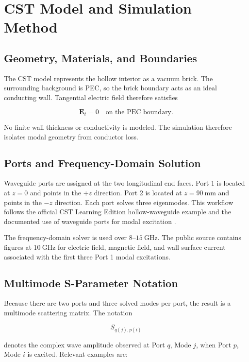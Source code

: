 \section{CST Model and Simulation Method}
\label{sec:cst-model}

\subsection{Geometry, Materials, and Boundaries}

The CST model represents the hollow interior as a vacuum brick. The surrounding background is PEC, so the brick boundary acts as an ideal conducting wall. Tangential electric field therefore satisfies

\[
\mathbf{E}_t=0
\quad\text{on the PEC boundary}.
\]

No finite wall thickness or conductivity is modeled. The simulation therefore isolates modal geometry from conductor loss.

\subsection{Ports and Frequency-Domain Solution}

Waveguide ports are assigned at the two longitudinal end faces. Port 1 is located at \(z=0\) and points in the \(+z\) direction. Port 2 is located at \(z=90~\mathrm{mm}\) and points in the \(-z\) direction. Each port solves three eigenmodes. This workflow follows the official CST Learning Edition hollow-waveguide example and the documented use of waveguide ports for modal excitation \cite{simulia_learning_tutorials,simulia_rf_components}.

The frequency-domain solver is used over \(8\)--\(15~\mathrm{GHz}\). The public source contains figures at \(10~\mathrm{GHz}\) for electric field, magnetic field, and wall surface current associated with the first three Port 1 modal excitations.

\subsection{Multimode S-Parameter Notation}

Because there are two ports and three solved modes per port, the result is a multimode scattering matrix. The notation

\[
S_{q(j),p(i)}
\]

denotes the complex wave amplitude observed at Port \(q\), Mode \(j\), when Port \(p\), Mode \(i\) is excited. Relevant examples are:


